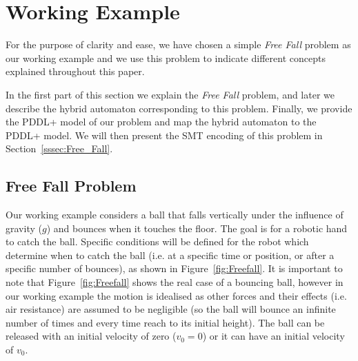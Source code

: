 \section{Working Example}\label{sec:working_example}

For the purpose of clarity and ease, we have chosen a simple \emph{Free Fall} problem as our working example and we use this problem to indicate different concepts explained throughout this paper. 

In the first part of this section we explain the \emph{Free Fall} problem, and later we describe the hybrid automaton corresponding to this problem. Finally, we provide the PDDL+  model of our problem and map the hybrid automaton to the PDDL+ model. We will then present the SMT encoding of this problem in Section~\ref{sssec:Free_Fall}.

\subsection{Free Fall Problem}


Our working example considers a ball that falls vertically under the influence of gravity ($g$) and bounces when it touches the floor. The goal is for a robotic hand to catch the ball. Specific conditions will be defined for the robot which determine when to catch the ball (i.e. at a specific time or position, or after a specific number of bounces), as shown in Figure~\ref{fig:Freefall}. It is important to note that Figure~\ref{fig:Freefall} shows the real case of a bouncing ball, however in our working example the motion is idealised as other forces and their effects (i.e. air resistance) are assumed to be negligible (so the ball will bounce an infinite number of times and every time reach to its initial height). The ball can be released with an initial velocity of zero ($v_0 = 0$) or it can have an initial velocity of $v_0$.

